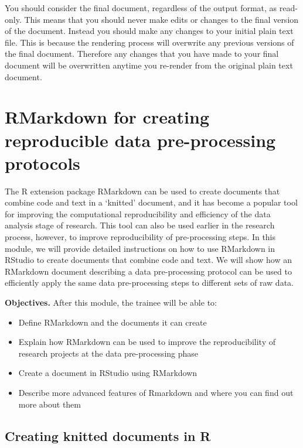 \documentclass[]{tufte-book}
\providecommand{\tightlist}{%
  \setlength{\itemsep}{0pt}\setlength{\parskip}{0pt}}
\begin{document}
You should consider the final document, regardless of the output format, as
read-only. This means that you should never make edits or changes to the final
version of the document. Instead you should make any changes to your initial
plain text file. This is because the rendering process will overwrite any
previous versions of the final document. Therefore any changes that you have
made to your final document will be overwritten anytime you re-render from the
original plain text document.

\section{RMarkdown for creating reproducible data pre-processing protocols}\label{module19}

The R extension package RMarkdown can be used to create documents that combine
code and text in a `knitted' document, and it has become a popular tool for
improving the computational reproducibility and efficiency of the data analysis
stage of research. This tool can also be used earlier in the research process,
however, to improve reproducibility of pre-processing steps. In this module, we
will provide detailed instructions on how to use RMarkdown in RStudio to create
documents that combine code and text. We will show how an RMarkdown document
describing a data pre-processing protocol can be used to efficiently apply the
same data pre-processing steps to different sets of raw data.

\textbf{Objectives.} After this module, the trainee will be able to:

\begin{itemize}
\tightlist
\item
  Define RMarkdown and the documents it can create
\item
  Explain how RMarkdown can be used to improve the reproducibility of research
  projects at the data pre-processing phase
\item
  Create a document in RStudio using RMarkdown
\item
  Describe more advanced features of Rmarkdown and where you can find out more
  about them
\end{itemize}

\subsection{Creating knitted documents in R}\label{creating-knitted-documents-in-r}
\end{document}
